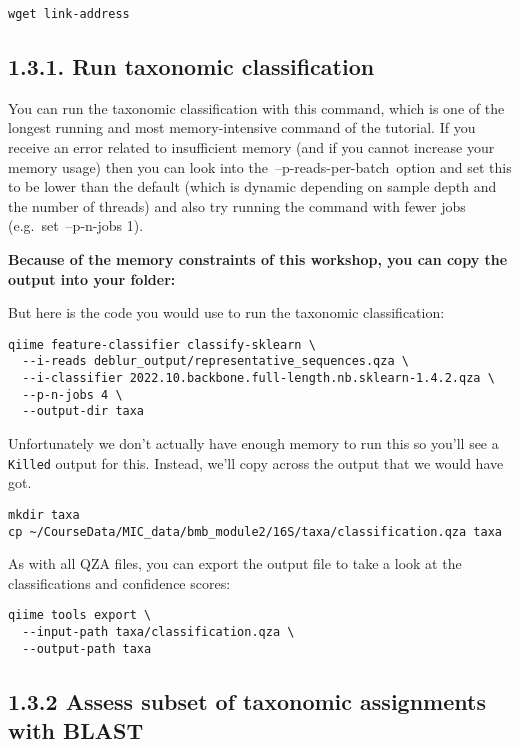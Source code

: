 \documentclass[
]{book}
\begin{document}
\begin{verbatim}
wget link-address
\end{verbatim}

\subsection{1.3.1. Run taxonomic classification}\label{run-taxonomic-classification}

You can run the taxonomic classification with this command, which is one of the longest running and most memory-intensive command of the tutorial. If you receive an error related to insufficient memory (and if you cannot increase your memory usage) then you can look into the~--p-reads-per-batch~option and set this to be lower than the default (which is dynamic depending on sample depth and the number of threads) and also try running the command with fewer jobs (e.g.~set~--p-n-jobs 1).

\textbf{Because of the memory constraints of this workshop, you can copy the output into your folder:}

But here is the code you would use to run the taxonomic classification:

\begin{verbatim}
qiime feature-classifier classify-sklearn \
  --i-reads deblur_output/representative_sequences.qza \
  --i-classifier 2022.10.backbone.full-length.nb.sklearn-1.4.2.qza \
  --p-n-jobs 4 \
  --output-dir taxa
\end{verbatim}

Unfortunately we don't actually have enough memory to run this so you'll see a \texttt{Killed} output for this.
Instead, we'll copy across the output that we would have got.

\begin{verbatim}
mkdir taxa      
cp ~/CourseData/MIC_data/bmb_module2/16S/taxa/classification.qza taxa
\end{verbatim}

As with all QZA files, you can export the output file to take a look at the classifications and confidence scores:

\begin{verbatim}
qiime tools export \
  --input-path taxa/classification.qza \
  --output-path taxa
\end{verbatim}

\subsection{1.3.2 Assess subset of taxonomic assignments with BLAST}\label{assess-subset-of-taxonomic-assignments-with-blast}
\end{document}
